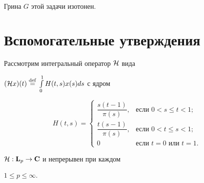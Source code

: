 Грина $G$ этой задачи изотонен.





\section{Вспомогательные утверждения}





Рассмотрим интегральный оператор $\cal H$ вида


$({\cal H}x)(t)\overset{\mathrm{def}}{=}{}


\int\limits_0^1 H(t,s)x(s)ds$ с ядром


$$


H(t,s)=


\begin{cases}


\dfrac{s(t-1)}{\pi(s)}, & \text{если } 0< s\le t< 1; \\


\dfrac{t(s-1)}{\pi(s)}, & \text{если } 0< t\le s< 1; \\


0 & \text{если } t=0\text{ или }t=1.


\end{cases}


$$





\begin{lem}


${\cal H}:\bold L_p\to\bold C$ и непрерывен при каждом


$1\le p\le\infty$.


\end{lem}






